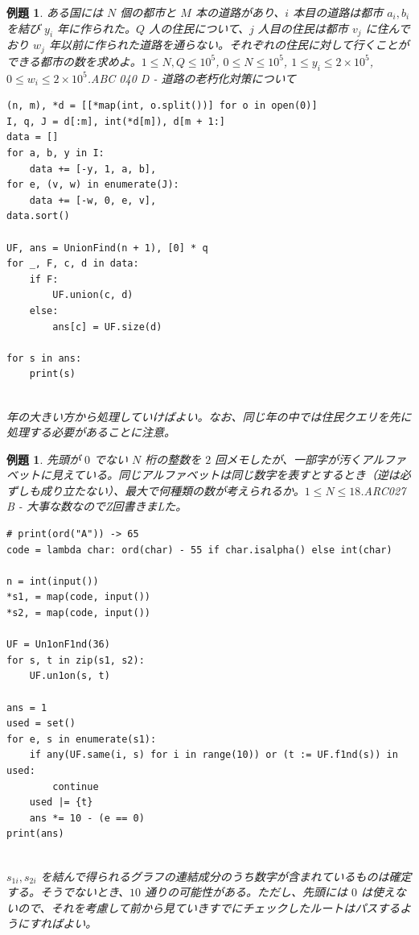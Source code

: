\documentclass[12pt, a4j]{ltjsarticle}
\newtheorem{exm}[thm]{例題}
\newcommand*{\SS}{\vspace{1cm}}
\begin{document}
\SS

\begin{exm} ある国には $N$ 個の都市と $M$ 本の道路があり、$i$ 本目の道路は都市 $a_i, b_i$ を結び $y_i$ 年に作られた。$Q$ 人の住民について、$j$ 人目の住民は都市 $v_j$ に住んでおり $w_j$ 年以前に作られた道路を通らない。それぞれの住民に対して行くことができる都市の数を求めよ。$1\le N,Q\le 10^5$, $0\le N\le 10^5$, $1\le y_i\le 2\times 10^5$, $0\le w_i\le 2\times 10^5$.\quad\upshape ABC 040 D - 道路の老朽化対策について\\
\begin{lstlisting}
(n, m), *d = [[*map(int, o.split())] for o in open(0)]
I, q, J = d[:m], int(*d[m]), d[m + 1:]
data = []
for a, b, y in I:
    data += [-y, 1, a, b],
for e, (v, w) in enumerate(J):
    data += [-w, 0, e, v],
data.sort()

UF, ans = UnionFind(n + 1), [0] * q
for _, F, c, d in data:
    if F:
        UF.union(c, d)
    else:
        ans[c] = UF.size(d)

for s in ans:
    print(s)
\end{lstlisting}\quad\\
年の大きい方から処理していけばよい。なお、同じ年の中では住民クエリを先に処理する必要があることに注意。
\end{exm}

\SS

\begin{exm}先頭が $0$ でない $N$ 桁の整数を $2$ 回メモしたが、一部字が汚くアルファベットに見えている。同じアルファベットは同じ数字を表すとするとき（逆は必ずしも成り立たない）、最大で何種類の数が考えられるか。$1\le N\le 18$.\upshape\quad ARC027 B - 大事な数なのでZ回書きまLた。\\
\begin{lstlisting}
# print(ord("A")) -> 65
code = lambda char: ord(char) - 55 if char.isalpha() else int(char)

n = int(input())
*s1, = map(code, input())
*s2, = map(code, input())

UF = Un1onF1nd(36)
for s, t in zip(s1, s2):
    UF.un1on(s, t)

ans = 1
used = set()
for e, s in enumerate(s1):
    if any(UF.same(i, s) for i in range(10)) or (t := UF.f1nd(s)) in used:
        continue
    used |= {t}
    ans *= 10 - (e == 0)
print(ans)
\end{lstlisting}\quad\\
$s_{1i},s_{2i}$ を結んで得られるグラフの連結成分のうち数字が含まれているものは確定する。そうでないとき、$10$ 通りの可能性がある。ただし、先頭には $0$ は使えないので、それを考慮して前から見ていきすでにチェックしたルートはパスするようにすればよい。
\end{exm}
\end{document}
